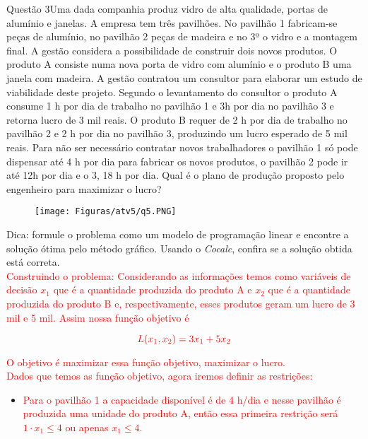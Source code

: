 \documentclass[12pt]{article}
\begin{document}
\begin{section}{Questão 3}{Uma dada companhia produz vidro de alta qualidade, portas de alumínio e janelas. A empresa tem três pavilhões. No pavilhão 1 fabricam-se peças de alumínio, no pavilhão 2 peças de madeira e no 3º o vidro e a montagem final. A gestão considera a possibilidade de construir dois novos produtos. O produto A consiste numa nova porta de vidro com alumínio e o produto B uma janela com madeira. A gestão contratou um consultor para elaborar um estudo de viabilidade deste projeto. Segundo o levantamento do consultor o produto A consume 1 h por dia de trabalho no pavilhão 1 e 3h por dia no pavilhão 3 e retorna lucro de 3 mil reais. O produto B requer de 2 h por dia de trabalho no pavilhão 2 e 2 h por dia no pavilhão 3, produzindo um lucro esperado de 5 mil reais. Para não ser necessário contratar novos trabalhadores o pavilhão 1 só pode dispensar até 4 h por dia para fabricar os novos produtos, o pavilhão 2 pode ir até 12h por dia e o 3, 18 h por dia. Qual é o plano de produção proposto pelo engenheiro para maximizar o lucro?}

\begin{figure}[H]
    \centering
    \texttt{[image: Figuras/atv5/q5.PNG]}
\end{figure}

\noindent Dica: formule o problema como um modelo de programação linear e encontre a solução ótima pelo método gráfico. Usando o \textit{Cocalc}, confira se a solução obtida está correta.\\

\noindent \textcolor{red}{Construindo o problema: Considerando as informações temos como variáveis de decisão $x_1$ que é a quantidade produzida do produto A e $x_2$ que é a quantidade produzida do produto B e, respectivamente, esses produtos geram um lucro de 3 mil e 5 mil. Assim nossa função objetivo é}

$$
\textcolor{red}{L(x_1,x_2) = 3x_1 + 5x_2}
$$

\noindent \textcolor{red}{O objetivo é maximizar essa função objetivo, maximizar o lucro.}\\

\noindent \textcolor{red}{Dados que temos as função objetivo, agora iremos definir as restrições:}

 \begin{itemize}
     \item \textcolor{red}{Para o pavilhão 1 a capacidade disponível é de 4 h/dia e nesse pavilhão é produzida uma unidade do produto A, então essa primeira restrição será $1 \cdot x_1 \leq 4$ ou apenas $x_1 \leq 4$.}
     

\end{itemize}
\end{section}
\end{document}
